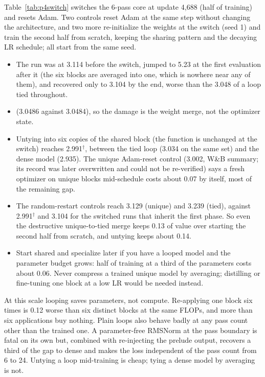 Table~\ref{tab:p4switch} switches the 6-pass core at update 4,688 (half of training) and resets Adam. Two controls reset Adam at the same step without changing the architecture, and two more re-initialize the weights at the switch (seed 1) and train the second half from scratch, keeping the sharing pattern and the decaying LR schedule; all start from the same seed.
\begin{itemize}
\item {} The run was at 3.114 before the switch, jumped to 5.23 at the first evaluation after it (the six blocks are averaged into one, which is nowhere near any of them), and recovered only to 3.104 by the end, worse than the 3.048 of a loop tied throughout.
\item {} (3.0486 against 3.0484), so the damage is the weight merge, not the optimizer state.
\item {} Untying into six copies of the shared block (the function is unchanged at the switch) reaches 2.991$^\dagger$, between the tied loop (3.034 on the same set) and the dense model (2.935). The unique Adam-reset control (3.002, W\&B summary; its record was later overwritten and could not be re-verified) says a fresh optimizer on unique blocks mid-schedule costs about 0.07 by itself, most of the remaining gap.
\item {} The random-restart controls reach 3.129 (unique) and 3.239 (tied), against 2.991$^\dagger$ and 3.104 for the switched runs that inherit the first phase. So even the destructive unique-to-tied merge keeps 0.13 of value over starting the second half from scratch, and untying keeps about 0.14.
\item {} Start shared and specialize later if you have a looped model and the parameter budget grows: half of training at a third of the parameters costs about 0.06. Never compress a trained unique model by averaging; distilling or fine-tuning one block at a low LR would be needed instead.
\end{itemize}

 At this scale looping saves parameters, not compute. Re-applying one block six times is 0.12 worse than six distinct blocks at the same FLOPs, and more than six applications buy nothing. Plain loops also behave badly at any pass count other than the trained one. A parameter-free RMSNorm at the pass boundary is fatal on its own but, combined with re-injecting the prelude output, recovers a third of the gap to dense and makes the loss independent of the pass count from 6 to 24. Untying a loop mid-training is cheap; tying a dense model by averaging is not.


